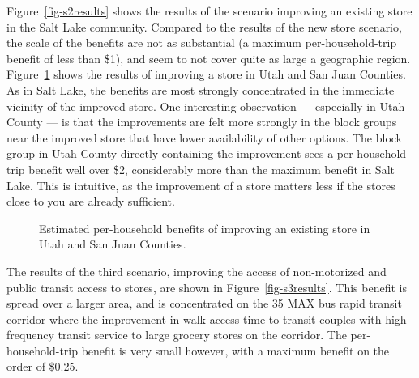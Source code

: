 \documentclass[
  letterpaper,
  number,
  review,
  3p]{elsarticle}
\begin{document}
Figure~\ref{fig-s2results} shows the results of the scenario improving
an existing store in the Salt Lake community. Compared to the results of
the new store scenario, the scale of the benefits are not as substantial
(a maximum per-household-trip benefit of less than \$1), and seem to not
cover quite as large a geographic region. Figure~\ref{fig-s2sjut} shows
the results of improving a store in Utah and San Juan Counties. As in
Salt Lake, the benefits are most strongly concentrated in the immediate
vicinity of the improved store. One interesting observation ---
especially in Utah County --- is that the improvements are felt more
strongly in the block groups near the improved store that have lower
availability of other options. The block group in Utah County directly
containing the improvement sees a per-household-trip benefit well over
\$2, considerably more than the maximum benefit in Salt Lake. This is
intuitive, as the improvement of a store matters less if the stores
close to you are already sufficient.

\begin{figure}

\begin{minipage}{0.50\linewidth}



\end{minipage}%
%
\begin{minipage}{0.50\linewidth}



\end{minipage}%

\caption{\label{fig-s2sjut}Estimated per-household benefits of improving
an existing store in Utah and San Juan Counties.}

\end{figure}%

The results of the third scenario, improving the access of non-motorized
and public transit access to stores, are shown in
Figure~\ref{fig-s3results}. This benefit is spread over a larger area,
and is concentrated on the 35 MAX bus rapid transit corridor where the
improvement in walk access time to transit couples with high frequency
transit service to large grocery stores on the corridor. The
per-household-trip benefit is very small however, with a maximum benefit
on the order of \$0.25.
\end{document}
